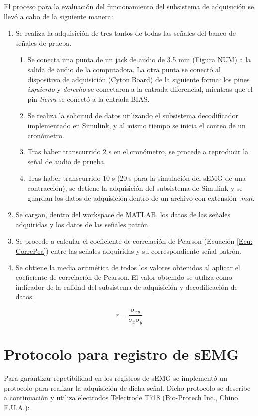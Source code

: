 \newpage
El proceso para la evaluación del funcionamiento del subsistema de adquisición se llevó a cabo de la siguiente manera:
\begin{enumerate}
	\item Se realiza la adquisición de tres tantos de todas las señales del banco de señales de prueba.
	\begin{enumerate}
		\item Se conecta una punta de un jack de audio de 3.5 mm (Figura NUM) a la salida de audio de la computadora. La otra punta se conectó al dispositivo de adquisición (Cyton Board) de la siguiente forma: los pines \emph{izquierdo} y \emph{derecho} se conectaron a la entrada diferencial, mientras que el pin \emph{tierra} se conectó a la entrada BIAS.
		\item Se realiza la solicitud de datos utilizando el subsistema decodificador implementado en Simulink, y al mismo tiempo se inicia el conteo de un cronómetro.
		\item Tras haber transcurrido 2 s en el cronómetro, se procede a reproducir la señal de audio de prueba.
		\item Tras haber transcurrido 10 s (20 s para la simulación del sEMG de una contracción), se detiene la adquisición del subsistema de Simulink y se guardan los datos de adquisición dentro de un archivo con extensión \emph{.mat}.
	\end{enumerate}
	\item Se cargan, dentro del workspace de MATLAB, los datos de las señales adquiridas y los datos de las señales patrón.
	\item Se procede a calcular el coeficiente de correlación de Pearson (Ecuación \ref{Ecu: CorrePea}) entre las señales adquiridas y su correspondiente señal patrón.
	\item Se obtiene la media aritmética de todos los valores obtenidos al aplicar el coeficiente de correlación de Pearson. El valor obtenido se utiliza como indicador de la calidad del subsistema de adquisición y decodificación de datos.
\end{enumerate}

\begin{equation}
	r = \frac{\sigma_{xy}}{\sigma_{x}\sigma_{y}}
	\label{Ecu: CorrePea}
\end{equation}


\newpage
\section{Protocolo para registro de sEMG}
Para garantizar repetibilidad en los registros de sEMG se implementó un protocolo para realizar la adquisición de dicha señal. Dicho protocolo se describe a continuación y utiliza electrodos Telectrode T718 (Bio-Protech Inc., Chino, E.U.A.):

